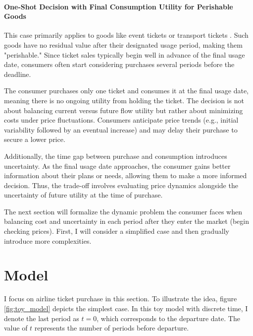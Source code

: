 \documentclass[12pt]{article}
\begin{document}
\paragraph{One-Shot Decision with Final Consumption Utility for Perishable Goods}
This case primarily applies to goods like event tickets
\citep{sweeting2012dynamic} or transport tickets
\citep{board2016revenue,gershkov2018revenue}. Such goods have no residual value
after their designated usage period, making them "perishable." Since ticket
sales typically begin well in advance of the final usage date, consumers often
start considering purchases several periods before the deadline.

The consumer purchases only one ticket and consumes it at the final usage date,
meaning there is no ongoing utility from holding the ticket. The decision is
not about balancing current versus future flow utility but rather about
minimizing costs under price fluctuations. Consumers anticipate price trends
(e.g., initial variability followed by an eventual increase) and may delay
their purchase to secure a lower price.

Additionally, the time gap between purchase and consumption introduces
uncertainty. As the final usage date approaches, the consumer gains better
information about their plans or needs, allowing them to make a more informed
decision. Thus, the trade-off involves evaluating price dynamics alongside the
uncertainty of future utility at the time of purchase.

The next section will formalize the dynamic problem the consumer faces when
balancing cost and uncertainty in each period after they enter the market
(begin checking prices). First, I will consider a simplified case and then
gradually introduce more complexities.

\section{Model}

I focus on airline ticket purchase in this section. To illustrate the idea,
figure \ref{fig:toy_model} depicts the simplest case. In this toy model with
discrete time, I denote the last period as \(t=0\), which corresponds to the
departure date. The value of \(t\) represents the number of periods before
departure.

\end{document}
